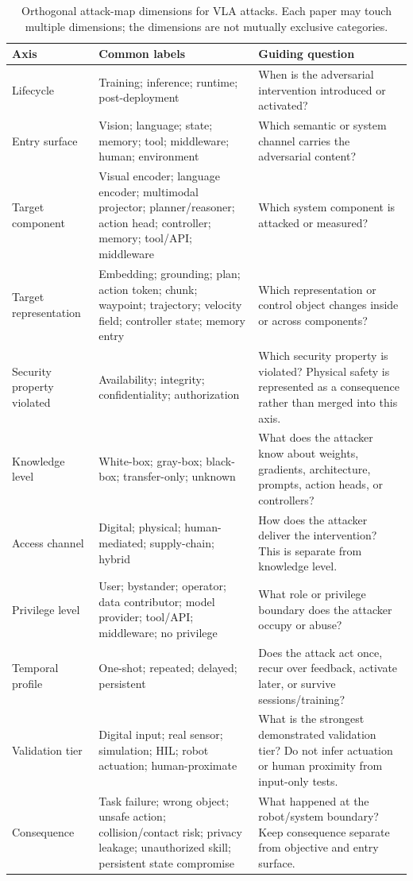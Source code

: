 \begin{table}[t]
\centering
\footnotesize
\caption{Orthogonal attack-map dimensions for VLA attacks. Each paper may touch multiple dimensions; the dimensions are not mutually exclusive categories.}
\label{tab:taxonomy-overview}
\renewcommand{\arraystretch}{1.08}
\setlength{\tabcolsep}{2.4pt}
\begin{tabularx}{\textwidth}{@{}p{}Y Y@{}}
\toprule
\textbf{Axis} & \textbf{Common labels} & \textbf{Guiding question} \\
\midrule
Lifecycle & Training; inference; runtime; post-deployment & When is the adversarial intervention introduced or activated? \\
Entry surface & Vision; language; state; memory; tool; middleware; human; environment & Which semantic or system channel carries the adversarial content? \\
Target component & Visual encoder; language encoder; multimodal projector; planner/reasoner; action head; controller; memory; tool/API; middleware & Which system component is attacked or measured? \\
Target representation & Embedding; grounding; plan; action token; chunk; waypoint; trajectory; velocity field; controller state; memory entry & Which representation or control object changes inside or across components? \\
Security property violated & Availability; integrity; confidentiality; authorization & Which security property is violated? Physical safety is represented as a consequence rather than merged into this axis. \\
Knowledge level & White-box; gray-box; black-box; transfer-only; unknown & What does the attacker know about weights, gradients, architecture, prompts, action heads, or controllers? \\
Access channel & Digital; physical; human-mediated; supply-chain; hybrid & How does the attacker deliver the intervention? This is separate from knowledge level. \\
Privilege level & User; bystander; operator; data contributor; model provider; tool/API; middleware; no privilege & What role or privilege boundary does the attacker occupy or abuse? \\
Temporal profile & One-shot; repeated; delayed; persistent & Does the attack act once, recur over feedback, activate later, or survive sessions/training? \\
Validation tier & Digital input; real sensor; simulation; HIL; robot actuation; human-proximate & What is the strongest demonstrated validation tier? Do not infer actuation or human proximity from input-only tests. \\
Consequence & Task failure; wrong object; unsafe action; collision/contact risk; privacy leakage; unauthorized skill; persistent state compromise & What happened at the robot/system boundary? Keep consequence separate from objective and entry surface. \\
\bottomrule
\end{tabularx}
\end{table}
